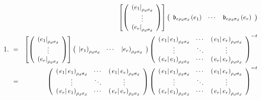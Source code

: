 \documentclass[aps,preprint]{revtex4}
\begin{document}
\begin{enumerate}
\item 
\begin{eqnarray}
&&\left[ \left( 
\begin{array}{c}
\left( e_{1}\right\vert _{\rho _{d}\sigma _{d}} \\ 
\vdots \\ 
\left( e_{r}\right\vert _{\rho _{d}\sigma _{d}}%
\end{array}%
\right) \right] \left( 
\begin{array}{ccc}
\mathfrak{b}_{e\rho _{d}\sigma _{d}}\left( e_{1}\right) & \cdots & \mathfrak{%
b}_{e\rho _{d}\sigma _{d}}\left( e_{r}\right)%
\end{array}%
\right) \\
&=&\left[ \left( 
\begin{array}{c}
\left( e_{1}\right\vert _{\rho _{d}\sigma _{d}} \\ 
\vdots \\ 
\left( e_{r}\right\vert _{\rho _{d}\sigma _{d}}%
\end{array}%
\right) \right] \left( 
\begin{array}{ccc}
\left\vert e_{1}\right) _{\rho _{d}\sigma _{d}} & \cdots & \left\vert
e_{r}\right) _{\rho _{d}\sigma _{d}}%
\end{array}%
\right) \left( 
\begin{array}{ccc}
\left( \left. e_{1}\right\vert e_{1}\right) _{\rho _{d}\sigma _{d}} & \cdots
& \left( \left. e_{1}\right\vert e_{r}\right) _{\rho _{d}\sigma _{d}} \\ 
\vdots & \ddots & \vdots \\ 
\left( \left. e_{r}\right\vert e_{1}\right) _{\rho _{d}\sigma _{d}} & \cdots
& \left( \left. e_{r}\right\vert e_{r}\right) _{\rho _{d}\sigma _{d}}%
\end{array}%
\right) ^{\boldsymbol{-}t} \\
&=&\left( 
\begin{array}{ccc}
\left( \left. e_{1}\right\vert e_{1}\right) _{\rho _{d}\sigma _{d}} & \cdots
& \left( \left. e_{1}\right\vert e_{r}\right) _{\rho _{d}\sigma _{d}} \\ 
\vdots & \ddots & \vdots \\ 
\left( \left. e_{r}\right\vert e_{1}\right) _{\rho _{d}\sigma _{d}} & \cdots
& \left( \left. e_{r}\right\vert e_{r}\right) _{\rho _{d}\sigma _{d}}%
\end{array}%
\right) \left( 
\begin{array}{ccc}
\left( \left. e_{1}\right\vert e_{1}\right) _{\rho _{d}\sigma _{d}} & \cdots
& \left( \left. e_{1}\right\vert e_{r}\right) _{\rho _{d}\sigma _{d}} \\ 
\vdots & \ddots & \vdots \\ 
\left( \left. e_{r}\right\vert e_{1}\right) _{\rho _{d}\sigma _{d}} & \cdots
& \left( \left. e_{r}\right\vert e_{r}\right) _{\rho _{d}\sigma _{d}}%
\end{array}%
\right) ^{\boldsymbol{-}t}
\end{eqnarray}


\end{enumerate}
\end{document}
